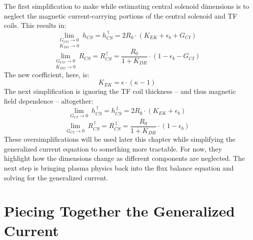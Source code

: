 The first simplification to make while estimating central solenoid dimensions is to neglect the magnetic current-carrying portions of the central solenoid and TF coils. This results in:
\begin{equation}
	\underset{K_{DO} \to 0}{\underset{G_{CO} \to 0}{\lim}} \ h_{CS} = h_{CS}^{\,\dagger} = 2 R_0 \cdot \left( K_{EK} + \epsilon_b + G_{CI} \right)
\end{equation}
\begin{equation}
	\underset{K_{DO} \to 0}{\underset{G_{CO} \to 0}{\lim}} \ R_{CS} = R_{CS}^{\,\dagger} = \frac{ R_0 }{ 1 + K_{DR} } \cdot \left( 1 - \epsilon_b - G_{CI}  \right)
\end{equation}
The new  coefficient, here, is:
\begin{equation}
	K_{EK} = \epsilon \cdot \left( \kappa - 1 \right)
\end{equation}
The next simplification is ignoring the TF coil thickness -- and thus magnetic field dependence -- altogether:
\begin{equation}
	\label{eq:hcs_simple}
	\underset{G_{CI} \to 0}{\lim} \ h_{CS}^{\,\dagger} = h_{CS}^{\,\ddagger} = 2 R_0 \cdot \left( K_{EK} + \epsilon_b \right)
\end{equation}
\begin{equation}
	\label{eq:rcs_simple}
	\underset{G_{CI} \to 0}{\lim} \ R_{CS}^{\,\dagger} = R_{CS}^{\,\ddagger} = \frac{ R_0 }{ 1 + K_{DR} } \cdot \left( 1 - \epsilon_b  \right)
\end{equation}
These oversimplifications will be used later this chapter while simplifying the generalized current equation to something more tractable. For now, they highlight how the dimensions change as different components are neglected. The next step is bringing plasma physics back into the flux balance equation and solving for the generalized current.

\section{Piecing Together the Generalized Current}

